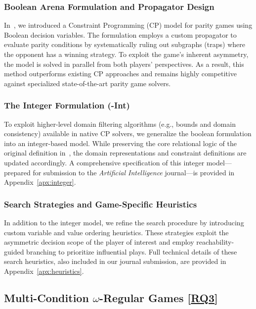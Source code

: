 \documentclass{article}
\begin{document}
\subsubsection{Boolean Arena Formulation and Propagator Design}
In~\cite{Hernandez:2026:noc}, we introduced a Constraint Programming (CP) model for parity games using Boolean decision variables. The formulation employs a custom propagator to evaluate parity conditions by systematically ruling out subgraphs (traps) where the opponent has a winning strategy. To exploit the game's inherent asymmetry, the model is solved in parallel from both players' perspectives. As a result, this method outperforms existing CP approaches and remains highly competitive against specialized state-of-the-art parity game solvers.

\subsubsection{The Integer Formulation (\nooppc-Int)}\label{sec:noc_int}
To exploit higher-level domain filtering algorithms (e.g., bounds and domain consistency) available in native CP solvers, we generalize the boolean formulation into an integer-based model. While preserving the core relational logic of the original definition in~\cite{Hernandez:2026:noc}, the domain representations and constraint definitions are updated accordingly. A comprehensive specification of this integer model---prepared for submission to the \textit{Artificial Intelligence} journal---is provided in Appendix~\ref{apx:integer}.

\subsubsection{Search Strategies and Game-Specific Heuristics}\label{sec:search_heuristics}
In addition to the integer model, we refine the search procedure by introducing custom variable and value ordering heuristics. These strategies exploit the asymmetric decision scope of the player of interest and employ reachability-guided branching to prioritize influential plays. Full technical details of these search heuristics, also included in our journal submission, are provided in Appendix~\ref{apx:heuristics}.


\subsection{Multi-Condition $\omega$-Regular Games [\hyperref[sec:rq]{RQ3}]}\label{sec:multicondition_modelling}
\end{document}
